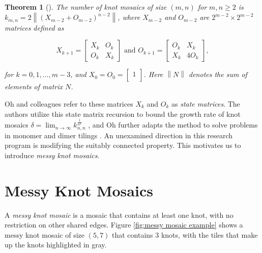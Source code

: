 \documentclass[12pt]{article}
\theoremstyle{plain}
\newtheorem{thm}{Theorem}[section]
\theoremstyle{definition}
\theoremstyle{remark}
\theoremstyle{definition}
\begin{document}
\begin{thm}[\cite{Oh2014}]
    \label{thm:Oh2014}
    The number of knot mosaics of size $(m,n)$ for $m,n \geq 2$ is $k_{m,n} = 2 \left\| (X_{m-2}+O_{m-2})^{n-2} \right\|$, where $X_{m-2}$ and $O_{m-2}$ are $2^{m-2} \times 2^{m-2}$ matrices defined as

    $$ X_{k+1} = \begin{bmatrix}
        X_k & O_k \\
        O_k & X_k
    \end{bmatrix}
    \text{ and }
    O_{k+1} = \begin{bmatrix}
        O_k & X_k \\
        X_k & 4O_k
    \end{bmatrix}, $$
    
    for $k=0,1,\dots,m-3$, and $X_0 = O_0 = \begin{bmatrix} 1 \\ \end{bmatrix}$. Here $\left\| N \right\|$ denotes the sum of elements of matrix $N$.
\end{thm}

Oh and colleagues refer to these matrices $X_k$ and $O_k$ as \textit{state matrices}. The authors utilize this state matrix recursion to bound the growth rate of knot mosaics $\delta = \lim_{n \to \infty} k_{n,n}^{\frac{1}{n^2}}$ \cite{Oh2016, Oh2019, Choi2024}, and Oh further adapts the method to solve problems in monomer and dimer tilings \cite{Oh2018Aztec, Oh2019tiling}. An unexamined direction in this research program is modifying the suitably connected property. This motivates us to introduce \textit{messy knot mosaics}.


\section{Messy Knot Mosaics}\label{section:messy mosaics}

A \textit{messy knot mosaic} is a mosaic that contains at least one knot, with no restriction on other shared edges. Figure \ref{fig:messy mosaic example} shows a messy knot mosaic of size $(5,7)$ that contains $3$ knots, with the tiles that make up the knots highlighted in gray. 
\end{document}
